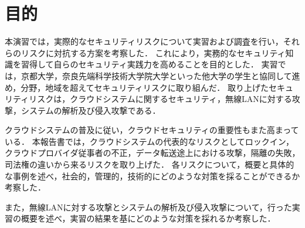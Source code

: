 \section{目的}
本演習では，実際的なセキュリティリスクについて実習および調査を行い，それらのリスクに対抗する方案を考察した．
これにより，実務的なセキュリティ知識を習得して自らのセキュリティ実践力を高めることを目的とした．
実習では，京都大学，奈良先端科学技術大学院大学といった他大学の学生と協同して進め，分野，地域を超えてセキュリティリスクに取り組んだ．
取り上げたセキュリティリスクは，クラウドシステムに関するセキュリティ，無線LANに対する攻撃，システムの解析及び侵入攻撃である．

クラウドシステムの普及に従い，クラウドセキュリティの重要性もまた高まっている．
本報告書では，クラウドシステムの代表的なリスクとしてロックイン，クラウドプロバイダ従事者の不正，データ転送途上における攻撃，隔離の失敗，司法権の違いから来るリスクを取り上げた．
各リスクについて，概要と具体的な事例を述べ，社会的，管理的，技術的にどのような対策を採ることができるか考察した．

また，無線LANに対する攻撃とシステムの解析及び侵入攻撃について，行った実習の概要を述べ，実習の結果を基にどのような対策を採れるか考察した．

